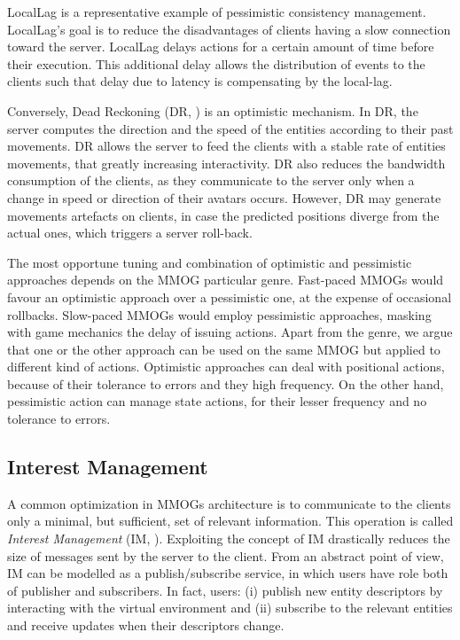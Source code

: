 \documentclass[final,10pt,a5paper]{phdimt}
\theoremstyle{definition}
\begin{document}
LocalLag \cite{Mauve2004} is a representative example of pessimistic consistency management.
LocalLag's goal is to reduce the disadvantages of clients having a slow connection toward the server.
LocalLag delays actions for a certain amount of time before their execution.
This additional delay allows the distribution of events to the clients such that delay due to latency is compensating by the
local-lag. 


Conversely, Dead Reckoning (DR, \cite{pantel2002suitability}) is an optimistic mechanism.
In DR, the server computes the direction and the speed of the entities according to their past movements.
DR allows the server to feed the clients with a stable rate of entities movements, that greatly increasing interactivity.   
DR also reduces the bandwidth consumption of the clients, as they communicate to the server only when a change in speed or direction of their avatars occurs.
However, DR may generate movements artefacts on clients, in case the predicted positions diverge from the actual ones, which triggers a server roll-back.



The most opportune tuning and combination of optimistic and pessimistic approaches depends on the MMOG particular genre. Fast-paced MMOGs would favour an optimistic approach over a pessimistic one, at the expense of occasional rollbacks.
Slow-paced MMOGs would employ pessimistic approaches, masking with game mechanics the delay of issuing actions.
Apart from the genre, we argue that one or the other approach can be used on the same MMOG but applied to different kind of actions.
Optimistic approaches can deal with positional actions, because of their tolerance to errors and they high frequency. On the other hand, pessimistic action can manage state actions, for their lesser frequency and no tolerance to errors.


\subsection{Interest Management}

A common optimization in MMOGs architecture is to communicate to the clients only a minimal, but sufficient, set of relevant information.
This operation is called  \textit{Interest Management} (IM, \cite{morse2000interest}).
Exploiting the concept of IM drastically reduces the size of messages sent by the server to the client. 
From an abstract point of view, IM can be modelled as a publish/subscribe service, in which users have role both of publisher and subscribers. 
In fact, users: (i) publish new entity descriptors by interacting with the virtual environment and (ii) subscribe to the relevant entities and receive updates when their descriptors change.
\end{document}
